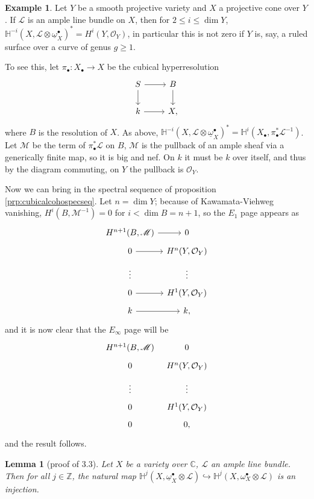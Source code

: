 \documentclass{report}
\newtheorem{lemma}[theorem]{Lemma}
\theoremstyle{definition}
\newtheorem{example}[theorem]{Example}
\newcommand{\CC}{\mathbb{C}}
\newcommand{\HH}{\mathbb{H}}
\newcommand{\LL}{\mathcal{L}}
\newcommand{\MM}{\mathscr{M}}
\newcommand{\OO}{\mathcal{O}}
\newcommand{\ZZ}{\mathbb{Z}}
\newcommand{\db}{\underline{\omega}^\bullet}
\begin{document}
\begin{example}
	Let $Y$ be a smooth projective variety and $X$ a projective cone over $Y$.
	If $\LL$ is an ample line bundle on $X$, then for $2 \leq i \leq \dim Y$, $\HH^{-i}(X, \LL \otimes \db_X)^* = H^i(Y, \OO_Y)$, in particular this is not zero if $Y$ is, say, a ruled surface over a curve of genus $g \geq 1$.
	
	To see this, let $\pi_\bullet : X_\bullet \rightarrow X$ be the cubical hyperresolution
	\[\begin{tikzcd}
		S \arrow{r} \arrow{d} & B \arrow{d} \\
		k \arrow{r} & X,
	\end{tikzcd}\]
	where $B$ is the resolution of $X$.
	As above, $\HH^{-i}(X, \LL \otimes \db_X)^* = \HH^i(X_\bullet, \pi_\bullet^* \LL^{-1})$.
	Let $\MM$ be the term of $\pi_\bullet^* \LL$ on $B$, $\MM$ is the pullback of an ample sheaf via a generically finite map, so it is big and nef.
	On $k$ it must be $k$ over itself, and thus by the diagram commuting, on $Y$ the pullback is $\OO_Y$.
	
	Now we can bring in the spectral sequence of proposition \ref{prp:cubicalcohospecseq}.
	Let $n = \dim Y$; because of Kawamata-Viehweg vanishing, $H^i(B, \MM^{-1}) = 0$ for $i < \dim B  = n + 1$, so the $E_1$ page appears as
	\[\begin{tikzcd}[row sep = tiny, column sep = tiny]
		H^{n+1}(B, \MM) \arrow{r} & 0 \\
		0 \arrow{r} & H^n(Y, \OO_Y) \\
		\vdots & \vdots \\
		0 \arrow{r} & H^1(Y, \OO_Y) \\
		k \arrow{r} & k,
	\end{tikzcd}\]
	and it is now clear that the $E_\infty$ page will be
	\[\begin{tikzcd}[row sep = tiny, column sep = tiny]
	H^{n+1}(B, \MM) & 0 \\
	0  & H^n(Y, \OO_Y) \\
	\vdots & \vdots \\
	0 & H^1(Y, \OO_Y) \\
	0 & 0,
	\end{tikzcd}\]
	and the result follows.
\end{example}

\begin{lemma}[proof of \cite{Kovacs2011a} 3.3]
	Let $X$ be a variety over $\CC$, $\LL$ an ample line bundle.
	Then for all $j \in \ZZ$, the natural map
	$\HH^j(X, \db_X \otimes \LL) \hookrightarrow \HH^j(X,\omega_X^\bullet \otimes \LL)$ is an injection.
\end{lemma}
\end{document}
